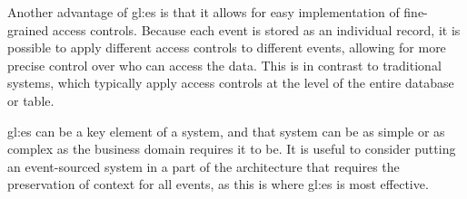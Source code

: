 Another advantage of \gls{gl:es} is that it allows for easy implementation of fine-grained access controls. Because each event is stored as an individual record, it is possible to apply different access controls to different events, allowing for more precise control over who can access the data. This is in contrast to traditional systems, which typically apply access controls at the level of the entire database or table.


\gls{gl:es} can be a key element of a system, and that system can be as simple or as complex as the business domain requires it to be. It is useful to consider putting an event-sourced system in a part of the architecture that requires the preservation of context for all events, as this is where \gls{gl:es} is most effective. 